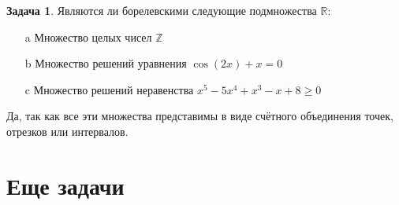 \documentclass[pdftex, 12pt, a4paper]{article}
\renewcommand{\geq}{\geqslant}
\theoremstyle{definition} %
\newtheorem{problem}{Задача}
\numberwithin{problem}{section}
\numberwithin{blits}{section}
\begin{document}
\begin{problem}
Являются ли борелевскими следующие подмножества $\mathbb{R}$: 
\begin{enumerate}
\item[a] Множество целых чисел $\mathbb{Z}$

\item[b] Множество решений уравнения $\cos(2x)+x=0$

\item[c] Множество решений неравенства $x^{5}-5x^{4}+x^{3}-x+8\geq 0$
\end{enumerate}
\begin{sol}
Да, так как все эти множества представимы в виде счётного объединения точек, отрезков или интервалов.
\end{sol}
\end{problem}




\section{Еще задачи}
\end{document}
